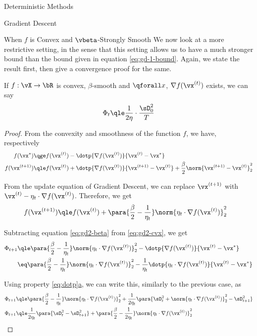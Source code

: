 \documentclass{article}
\newcommand{\x}[1]{\vx^{(#1)}}
\newcommand{\xs}{\vx^{\ast}}
\newcommand{\f}[1]{f(\vx^{(#1)})}
\newcommand{\fs}{f(\vx^\ast)}
\newcommand{\gf}[1]{\nabla f(\vx^{(#1)})}
\begin{document}
\begin{psection}{Deterministic Methods}
\begin{psubsection}{Gradient Descent}
\begin{pssubsection}{When $f$ is Convex and $\vbeta$-Strongly Smooth}
			We now look at a more restrictive setting, in the sense that this setting allows us to have a much stronger bound than the bound given in equation \ref{eq:gd-1-bound}. Again, we state the result first, then give a convergence proof for the same. \sbr

			\begin{theorem}
				If $f : \vX \to \bR$ is convex, $\beta$-smooth and $\qforall x$, $\gf{t}$ exists, we can say
				\begin{align}
					\Phi_t	\qle	\frac{1}{2 \eta} \cdot \frac{\sD_0^2}{T}
					\label{eq:gd-cvx-bddg}
				\end{align}
				\label{th:gd-cvx-bddg}

				\begin{proof}
					From the convexity and smoothness of the function $f$, we have, respectively
					\begin{align}
						\fs			&\qge	\f{t} - \dotp{\gf{t}}{\x{t} - \xs} \label{eq:gd2-beta} \\
						\f{t + 1}	&\qle	\f{t} + \dotp{\gf{t}}{\x{t + 1} - \x{t}} + \frac{\beta}{2} \norm{\x{t + 1} - \x{t}}_2^2 \nonumber
					\end{align}

					From the update equation of Gradient Descent, we can replace $\x{t + 1}$ with $\x{t} - \eta_t \cdot \gf{t}$. Therefore, we get
					\begin{align}
						\f{t + 1}	&\qle	\f{t} + \para{\frac{\beta}{2} - \frac{1}{\eta_t}} \norm{\eta_t \cdot \gf{t}}_2^2 \label{eq:gd2-cvx}
					\end{align}

					Subtracting equation \ref{eq:gd2-beta} from \ref{eq:gd2-cvx}, we get
					\begin{align*}
						\Phi_{t + 1}	&\qle	\para{\frac{\beta}{2} - \frac{1}{\eta_t}} \norm{\eta_t \cdot \gf{t}}_2^2 - \dotp{\gf{t}}{\x{t} - \xs} \\
						&\eq	\para{\frac{\beta}{2} - \frac{1}{\eta_t}} \norm{\eta_t \cdot \gf{t}}_2^2 - \frac{1}{\eta_t} \dotp{\eta_t \cdot \gf{t}}{\x{t} - \xs}
					\end{align*}

					Using property \hyperref[eq:dotp]{\ref*{eq:dotp}a}, we can write this, similarly to the previous case, as
					\begin{align*}
						\Phi_{t + 1}	&\qle	\para{\frac{\beta}{2} - \frac{1}{\eta_t}} \norm{\eta_t \cdot \gf{t}}_2^2 + \frac{1}{2 \eta_t} \para{\sD_t^2 + \norm{\eta_t \cdot \gf{t}}_2^2 - \sD_{t + 1}^2} \\
						\Phi_{t + 1}	&\qle	\frac{1}{2 \eta_t} \para{\sD_t^2 - \sD_{t + 1}^2} + \para{\frac{\beta}{2} - \frac{1}{2 \eta_t}} \norm{\eta_t \cdot \gf{t}}_2^2
					\end{align*}


\end{proof}
\end{theorem}
\end{pssubsection}
\end{psubsection}
\end{psection}
\end{document}
